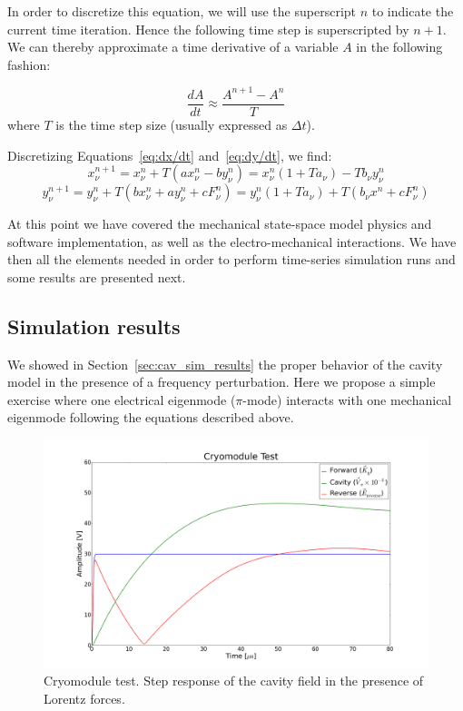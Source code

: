 \documentclass[a4paper,12pt]{article}
\newcommand{\be}{\begin{equation}}
\newcommand{\ee}{\end{equation}}
\begin{document}
In order to discretize this equation, we will use the superscript $n$ to indicate the current time iteration. Hence the following time step is superscripted by $n+1$. We can thereby approximate a time derivative of a variable $A$ in the following fashion:

\be
\frac{dA}{dt} \approx \frac{A^{n+1} - A^{n}}{T}
\ee
where $T$ is the time step size (usually expressed as $\Delta t$).

Discretizing Equations~\ref{eq:dx/dt} and~\ref{eq:dy/dt}, we find:
\be
\label{eq_x}
x^{n+1}_{\nu} = x^{n}_{\nu} + T(ax^{n}_{\nu} - by^{n}_{\nu}) = x^{n}_{\nu}(1 + Ta_{\nu}) - Tb_{\nu}y^{n}_{\nu}
\ee
\be
\label{eq_y}
y^{n+1}_{\nu} = y^{n}_{\nu} + T(bx^{n}_{\nu} + ay^{n}_{\nu} + cF^{n}_{\nu}) = y^{n}_{\nu}(1+Ta_{\nu}) + T(b_{\nu}x^{n} + cF^{n}_{\nu})
\ee

At this point we have covered the mechanical state-space model physics and software implementation, as well as the electro-mechanical interactions. We have then all the elements needed in order to perform time-series simulation runs and some results are presented next.

\subsection{Simulation results}

We showed in Section~\ref{sec:cav_sim_results} the proper behavior of the cavity model in the presence of a frequency perturbation. Here we propose a simple exercise where one electrical eigenmode ($\pi$-mode) interacts with one mechanical eigenmode following the equations described above.

\begin{figure}
\centering
\includegraphics[scale=0.25]{../figures/cryo_test_step.png}
\caption{Cryomodule test. Step response of the cavity field in the presence of Lorentz forces.}
\label{fig:cryo_test_step}
\end{figure}
\end{document}
